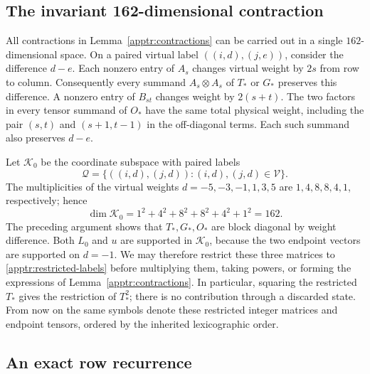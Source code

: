 \subsection{The invariant 162-dimensional contraction}

All contractions in Lemma~\ref{apptr:contractions} can be carried out
in a single $162$-dimensional space.  On a paired virtual label
$((i,d),(j,e))$, consider the difference $d-e$.  Each nonzero entry
of $A_s$ changes virtual weight by $2s$ from row to column.
Consequently every summand $A_s\otimes A_s$ of $T_*$ or $G_*$
preserves this difference.  A nonzero entry of $B_{st}$ changes
weight by $2(s+t)$.  The two factors in every tensor summand of
$O_*$ have the same total physical weight, including the pair
$(s,t)$ and $(s+1,t-1)$ in the off-diagonal terms.  Each such
summand also preserves $d-e$.

Let $\mathcal K_0$ be the coordinate subspace with paired labels
\begin{equation}\label{apptr:restricted-labels}
 \mathcal Q=\{((i,d),(j,d)):(i,d),(j,d)\in\mathcal V\}.
\end{equation}
The multiplicities of the virtual weights
$d=-5,-3,-1,1,3,5$ are $1,4,8,8,4,1$, respectively; hence
\begin{equation}\label{apptr:restricted-dimension}
 \dim\mathcal K_0=1^2+4^2+8^2+8^2+4^2+1^2=162.
\end{equation}
The preceding argument shows that $T_*,G_*,O_*$ are block diagonal
by weight difference.  Both $L_0$ and $u$ are supported in
$\mathcal K_0$, because the two endpoint vectors are supported on
$d=-1$.  We may therefore restrict these three matrices to
\eqref{apptr:restricted-labels} before multiplying them, taking
powers, or forming the expressions of
Lemma~\ref{apptr:contractions}.  In particular, squaring the
restricted $T_*$ gives the restriction of $T_*^2$; there is no
contribution through a discarded state.  From now on the same
symbols denote these restricted integer matrices and endpoint
tensors, ordered by the inherited lexicographic order.

\subsection{An exact row recurrence}

